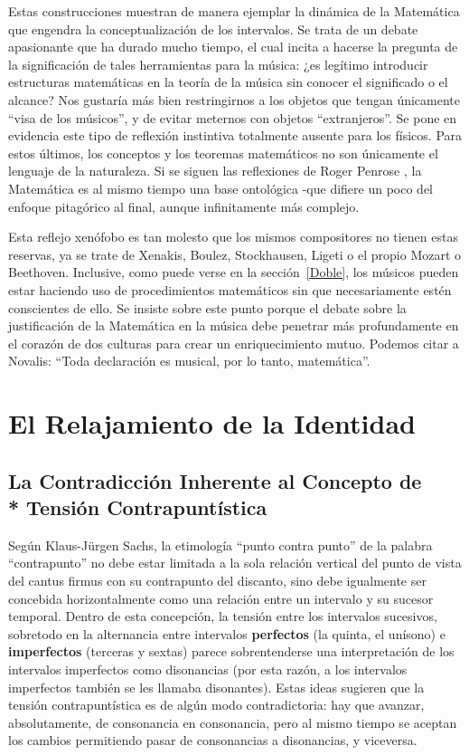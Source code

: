 \documentclass[letterpaper,12pt]{book}
\theoremstyle{definition} \newtheorem{Def}{Definición}[chapter]
\theoremstyle{definition} \newtheorem{Teo}{Teorema}[chapter]
\theoremstyle{definition} \newtheorem{Pro}{Proposición}[chapter]
\theoremstyle{definition} \newtheorem{Lema}{Lema}[chapter]
\begin{document}
Estas construcciones muestran de manera ejemplar la dinámica de la Matemática que engendra la conceptualización de los intervalos. Se trata de un debate apasionante que ha durado mucho tiempo, el cual incita a hacerse la pregunta de la significación de tales herramientas para la música: ¿es legítimo introducir estructuras matemáticas en la teoría de la música sin conocer el significado o el alcance? Nos gustaría más bien restringirnos a los objetos que tengan únicamente ``visa de los músicos'', y de evitar meternos  con objetos ``extranjeros''. Se pone en evidencia este tipo de reflexión instintiva totalmente ausente para los físicos. Para estos últimos, los conceptos y los teoremas matemáticos no son únicamente el lenguaje de la naturaleza. Si se siguen las reflexiones de Roger Penrose \cite{Penrose}, la Matemática es al mismo tiempo una base ontológica -que difiere un poco del enfoque pitagórico al final, aunque infinitamente más complejo.

Esta reflejo xenófobo es tan molesto que los mismos compositores no tienen estas reservas, ya se trate de Xenakis, Boulez, Stockhausen, Ligeti o el propio Mozart o Beethoven. Inclusive, como puede verse en la sección~\ref{Doble}, los músicos pueden estar haciendo uso de procedimientos matemáticos sin que necesariamente estén conscientes de ello. Se insiste sobre este punto porque el debate sobre la justificación de la Matemática en la música debe penetrar más profundamente en el corazón de dos culturas para crear un enriquecimiento mutuo. Podemos citar a Novalis: ``Toda declaración es musical, por lo tanto, matemática''\cite{Verite}.

\section{El Relajamiento de la Identidad}

\subsection[La Contradicción Inherente al Concepto de Tensión]{La Contradicción Inherente al Concepto de \\* Tensión Contrapuntística}

Según Klaus-Jürgen Sachs, la etimología ``punto contra punto'' de la palabra ``contrapunto'' no debe estar limitada a la sola relación vertical del punto de vista del cantus firmus con su contrapunto del discanto, sino debe igualmente ser concebida horizontalmente como una relación entre un intervalo y su sucesor temporal. Dentro de esta concepción, la tensión entre los intervalos sucesivos, sobretodo en la alternancia entre intervalos \textbf{perfectos} (la quinta, el unísono) e \textbf{imperfectos} (terceras y sextas) parece sobrentenderse una interpretación de los intervalos imperfectos como disonancias (por esta razón, a los intervalos imperfectos también se les llamaba disonantes\cite{Sachs}). Estas ideas sugieren que la tensión contrapuntística es de algún modo contradictoria: hay que avanzar, absolutamente, de consonancia en consonancia, pero al mismo tiempo se aceptan los cambios permitiendo pasar de consonancias a disonancias, y viceversa.
\end{document}
